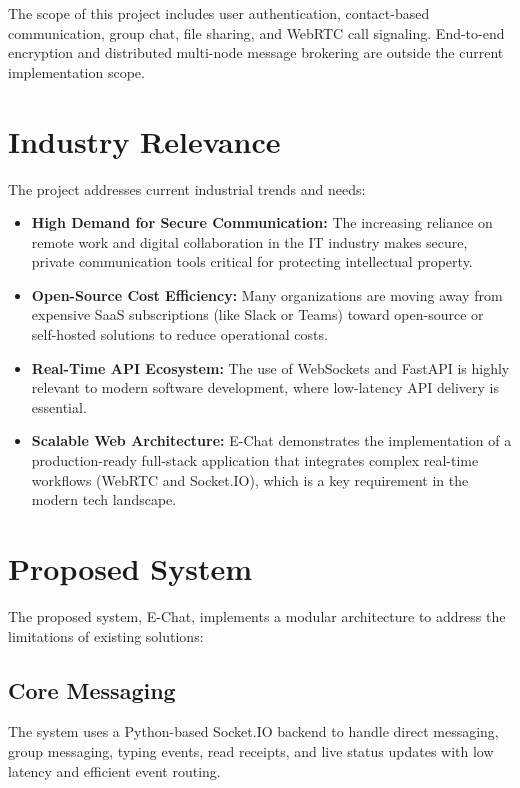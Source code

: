 \documentclass[12pt,a4paper,oneside]{report}
\begin{document}
The scope of this project includes user authentication, contact-based communication,
group chat, file sharing, and WebRTC call signaling. End-to-end encryption and
distributed multi-node message brokering are outside the current implementation scope.

\section{Industry Relevance}
\label{sec:industry-relevance}

The project addresses current industrial trends and needs:
\begin{itemize}
    \item \textbf{High Demand for Secure Communication:} The increasing reliance on remote
          work and digital collaboration in the IT industry makes secure, private
          communication tools critical for protecting intellectual property.
    \item \textbf{Open-Source Cost Efficiency:} Many organizations are moving away
          from expensive SaaS subscriptions (like Slack or Teams) toward open-source
          or self-hosted solutions to reduce operational costs.
    \item \textbf{Real-Time API Ecosystem:} The use of WebSockets and FastAPI is
          highly relevant to modern software development, where low-latency API
          delivery is essential.
    \item \textbf{Scalable Web Architecture:} E-Chat demonstrates the implementation
          of a production-ready full-stack application that integrates complex
          real-time workflows (WebRTC and Socket.IO), which is a key requirement
          in the modern tech landscape.
\end{itemize}

\section{Proposed System}
\label{sec:proposed-system}

The proposed system, E-Chat, implements a modular architecture to address the
limitations of existing solutions:

\subsection{Core Messaging}
\label{subsec:core-messaging}
The system uses a Python-based Socket.IO backend to handle direct messaging,
group messaging, typing events, read receipts, and live status updates with
low latency and efficient event routing.
\end{document}
